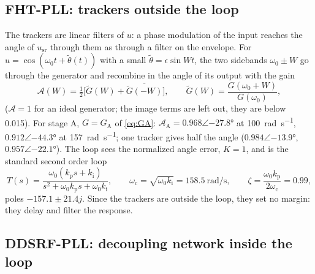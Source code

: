 \documentclass[11pt,a4paper]{scrartcl}
\newcommand{\ped}[1]{_{\mathrm{#1}}}
\begin{document}
\begin{onehalfspace}
\subsection{FHT-PLL: trackers outside the loop}
\label{sec:fhtmodel}

The trackers are linear filters of $u$: a phase modulation of the input reaches the angle of $u\ped{sr}$ through them as through a filter on the envelope. For $u = \cos(\omega_0 t + \tilde\theta(t))$ with a small $\tilde\theta = \epsilon\sin Wt$, the two sidebands $\omega_0 \pm W$ go through the generator and recombine in the angle of its output with the gain
\begin{equation}
	\mathcal{A}(W) = \tfrac12\Big[\tilde G(W) + \overline{\tilde G(-W)}\Big], \qquad \tilde G(W) = \frac{G(\omega_0 + W)}{G(\omega_0)},
	\label{eq:env}
\end{equation}
($\mathcal{A} = 1$ for an ideal generator; the image terms are left out, they are below \num{0.015}). For stage A, $G = G\ped{A}$ of \eqref{eq:GA}: $\mathcal{A}\ped{A} = 0.968\angle\ang{-27.8}$ at \SI{100}{\radian\per\second}, $0.912\angle\ang{-44.3}$ at \SI{157}{\radian\per\second}; one tracker gives half the angle ($0.984\angle\ang{-13.9}$, $0.957\angle\ang{-22.1}$). The loop sees the normalized angle error, $K = 1$, and is the standard second order loop
\begin{equation}
	T(s) = \frac{\omega_0 (k\ped{p} s + k\ped{i})}{s^2 + \omega_0 k\ped{p} s + \omega_0 k\ped{i}}, \qquad \omega\ped{c} = \sqrt{\omega_0 k\ped{i}} = \SI{158.5}{\radian\per\second}, \qquad \zeta = \frac{\omega_0 k\ped{p}}{2\omega\ped{c}} = 0.99,
	\label{eq:Tfht}
\end{equation}
poles $-157.1 \pm 21.4j$. Since the trackers are outside the loop, they set no margin: they delay and filter the response.

\subsection{DDSRF-PLL: decoupling network inside the loop}
\label{sec:ddsrfmodel}


\end{onehalfspace}
\end{document}
